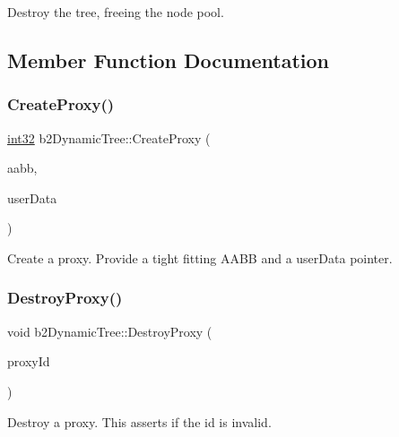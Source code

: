 Destroy the tree, freeing the node pool. 



\subsection{Member Function Documentation}
\mbox{\label{classb2_dynamic_tree_ae44676f12977dada46037da47fc7ffbf}} 
\subsubsection{\texorpdfstring{CreateProxy()}{CreateProxy()}}
{\footnotesize\ttfamily \mbox{\hyperlink{b2_settings_8h_a43d43196463bde49cb067f5c20ab8481}{int32}} b2\+Dynamic\+Tree\+::\+Create\+Proxy (\begin{DoxyParamCaption}\item[{const \mbox{\hyperlink{structb2_a_a_b_b}{b2\+A\+A\+BB}} \&}]{aabb,  }\item[{void $\ast$}]{user\+Data }\end{DoxyParamCaption})}



Create a proxy. Provide a tight fitting A\+A\+BB and a user\+Data pointer. 

\mbox{\label{classb2_dynamic_tree_a62aa451e7d7fe029818dd05f76ea9cdc}} 
\subsubsection{\texorpdfstring{DestroyProxy()}{DestroyProxy()}}
{\footnotesize\ttfamily void b2\+Dynamic\+Tree\+::\+Destroy\+Proxy (\begin{DoxyParamCaption}\item[{\mbox{\hyperlink{b2_settings_8h_a43d43196463bde49cb067f5c20ab8481}{int32}}}]{proxy\+Id }\end{DoxyParamCaption})}



Destroy a proxy. This asserts if the id is invalid. 

\mbox{\label{classb2_dynamic_tree_a87da9819c4f190faec38f7fe4608caae}} 
